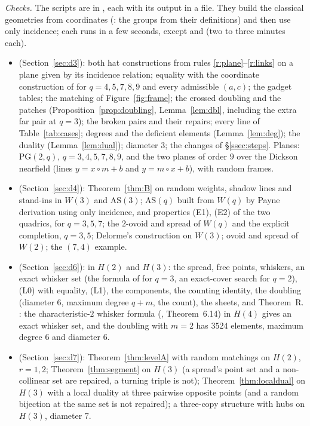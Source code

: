 \documentclass[11pt]{amsart}
\theoremstyle{definition}
\theoremstyle{remark}
\begin{document}
\emph{Checks.} The scripts are in , each with its output in a  file. They build the classical geometries from coordinates (: the groups from their definitions) and then use only incidence; each runs in a few seconds, except  and  (two to three minutes each).
\begin{itemize}[leftmargin=1.5em]
\item {} (Section~\ref{sec:d3}): both hat constructions from rules \ref{r:plane}--\ref{r:links} on a plane given by its incidence relation; equality with the coordinate construction of  for $q=4,5,7,8,9$ and every admissible $(a,c)$; the gadget tables; the matching of Figure~\ref{fig:frame}; the crossed doubling and the patches (Proposition~\ref{prop:doubling}, Lemma~\ref{lem:dbl}, including the extra far pair at $q=3$); the broken pairs and their repairs; every line of Table~\ref{tab:cases}; degrees and the deficient elements (Lemma~\ref{lem:deg}); the duality (Lemma~\ref{lem:dual}); diameter $3$; the changes of \S\ref{ssec:steps}. Planes: $\mathrm{PG}(2,q)$, $q=3,4,5,7,8,9$, and the two planes of order $9$ over the Dickson nearfield (lines $y=x\circ m+b$ and $y=m\circ x+b$), with random frames.
\item {} (Section~\ref{sec:d4}): Theorem~\ref{thm:B} on random weights, shadow lines and stand-ins in $W(3)$ and $\mathrm{AS}(3)$; $\mathrm{AS}(q)$ built from $W(q)$ by Payne derivation using only incidence, and properties (E1), (E2) of the two quadrics, for $q=3,5,7$; the $2$-ovoid and spread of $W(q)$ and the explicit completion, $q=3,5$; Delorme's construction on $W(3)$; ovoid and spread of $W(2)$; the $(7,4)$ example.
\item {} (Section~\ref{sec:d6}): in $H(2)$ and $H(3)$: the spread, free points, whiskers, an exact whisker set (the formula of  for $q=3$, an exact-cover search for $q=2$), (L0) with equality, (L1), the components, the counting identity, the doubling (diameter $6$, maximum degree $q+m$, the count), the sheets, and Theorem~R. : the characteristic-$2$ whisker formula (, Theorem~6.14) in $H(4)$ gives an exact whisker set, and the doubling with $m=2$ has $3524$ elements, maximum degree $6$ and diameter $6$.
\item {} (Section~\ref{sec:d7}): Theorem~\ref{thm:levelA} with random matchings on $H(2)$, $r=1,2$; Theorem~\ref{thm:segment} on $H(3)$ (a spread's point set and a non-collinear set are repaired, a turning triple is not); Theorem~\ref{thm:localdual} on $H(3)$ with a local duality at three pairwise opposite points (and a random bijection at the same set is not repaired); a three-copy structure with hubs on $H(3)$, diameter $7$.

\end{itemize}
\end{document}
